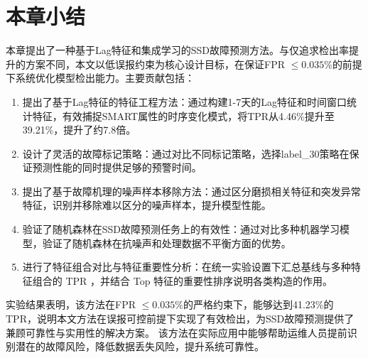 \section{本章小结}

本章提出了一种基于Lag特征和集成学习的SSD故障预测方法。与仅追求检出率提升的方案不同，本文以低误报约束为核心设计目标，在保证FPR $\leq 0.035\%$的前提下系统优化模型检出能力。主要贡献包括：

\begin{enumerate}
    \item 提出了基于Lag特征的特征工程方法：通过构建1-7天的Lag特征和时间窗口统计特征，有效捕捉SMART属性的时序变化模式，将TPR从4.46\%提升至39.21\%，提升了约7.8倍。
    
    \item 设计了灵活的故障标记策略：通过对比不同标记策略，选择label\_30策略在保证预测性能的同时提供足够的预警时间。
    
    \item 提出了基于故障机理的噪声样本移除方法：通过区分磨损相关特征和突发异常特征，识别并移除难以区分的噪声样本，提升模型性能。
    
    \item 验证了随机森林在SSD故障预测任务上的有效性：通过对比多种机器学习模型，验证了随机森林在抗噪声和处理数据不平衡方面的优势。
    
    \item 进行了特征组合对比与特征重要性分析：在统一实验设置下汇总基线与多种特征组合的 TPR ，并结合 Top 特征的重要性排序说明各类构造的作用。
\end{enumerate}

实验结果表明，该方法在FPR $\leq 0.035\%$的严格约束下，能够达到41.23\%的TPR，说明本文方法在误报可控前提下实现了有效检出，为SSD故障预测提供了兼顾可靠性与实用性的解决方案。
该方法在实际应用中能够帮助运维人员提前识别潜在的故障风险，降低数据丢失风险，提升系统可靠性。
